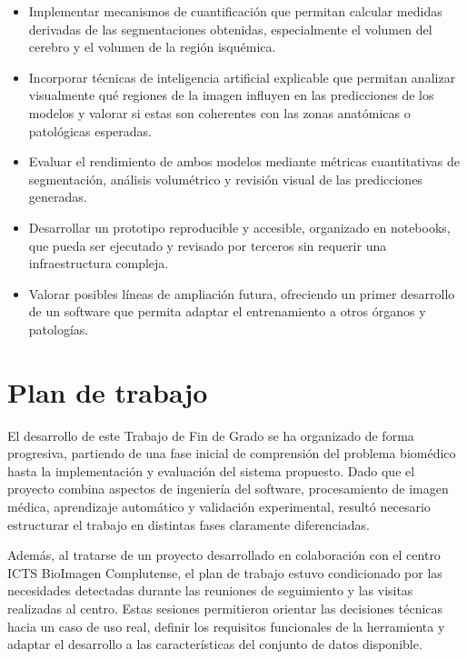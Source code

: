 \begin{itemize}
    \item[\textbf{O10.}] Implementar mecanismos de cuantificación que permitan calcular medidas derivadas de las segmentaciones obtenidas, especialmente el volumen del cerebro y el volumen de la región isquémica.

    \item[\textbf{O11.}] Incorporar técnicas de inteligencia artificial explicable que permitan analizar visualmente qué regiones de la imagen influyen en las predicciones de los modelos y valorar si estas son coherentes con las zonas anatómicas o patológicas esperadas.

    \item[\textbf{O12.}] Evaluar el rendimiento de ambos modelos mediante métricas cuantitativas de segmentación, análisis volumétrico y revisión visual de las predicciones generadas.

    \item[\textbf{O13.}] Desarrollar un prototipo reproducible y accesible, organizado en notebooks, que pueda ser ejecutado y revisado por terceros sin requerir una infraestructura compleja.

    \item[\textbf{O14.}] Valorar posibles líneas de ampliación futura, ofreciendo un primer desarrollo de un software que permita adaptar el entrenamiento a otros órganos y patologías.
\end{itemize}

\section{Plan de trabajo}

El desarrollo de este Trabajo de Fin de Grado se ha organizado de forma progresiva, partiendo de una fase inicial de comprensión del problema biomédico hasta la implementación y evaluación del sistema propuesto. Dado que el proyecto combina aspectos de ingeniería del software, procesamiento de imagen médica, aprendizaje automático y validación experimental, resultó necesario estructurar el trabajo en distintas fases claramente diferenciadas.

Además, al tratarse de un proyecto desarrollado en colaboración con el centro ICTS BioImagen Complutense, el plan de trabajo estuvo condicionado por las necesidades detectadas durante las reuniones de seguimiento y las visitas realizadas al centro. Estas sesiones permitieron orientar las decisiones técnicas hacia un caso de uso real, definir los requisitos funcionales de la herramienta y adaptar el desarrollo a las características del conjunto de datos disponible.

